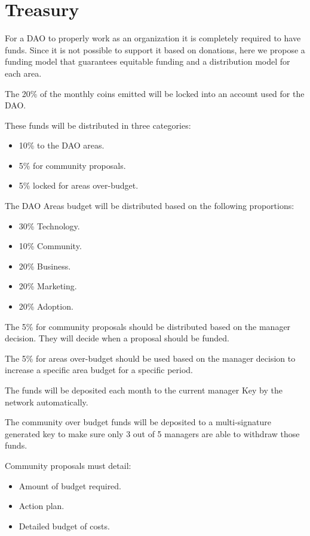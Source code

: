 \documentclass{article}
\begin{document}
\section{Treasury}

For a DAO to properly work as an organization it is completely required to have funds. Since it is not possible to support it based on donations, here we propose a funding model that guarantees equitable funding and a distribution model for each area.

The 20\% of the monthly coins emitted will be locked into an account used for the DAO.

These funds will be distributed in three categories:

\begin{itemize}
  \item 10\% to the DAO areas.
  \item 5\% for community proposals.
  \item 5\% locked for areas over-budget.
\end{itemize}

The DAO Areas budget will be distributed based on the following proportions:

\begin{itemize}
  \item 30\% Technology.
  \item 10\% Community.
  \item 20\% Business.
  \item 20\% Marketing.
  \item 20\% Adoption.
\end{itemize}

The 5\% for community proposals should be distributed based on the manager decision. They will decide when a proposal should be funded.

The 5\% for areas over-budget should be used based on the manager decision to increase a specific area budget for a specific period.

The funds will be deposited each month to the current manager Key by the network automatically.

The community  over budget funds will be deposited to a multi-signature generated key to make sure only 3 out of 5 managers are able to withdraw those funds.

Community proposals must detail:

\begin{itemize}
  \item Amount of budget required.
  \item Action plan.
  \item Detailed budget of costs.
\end{itemize}
\end{document}
